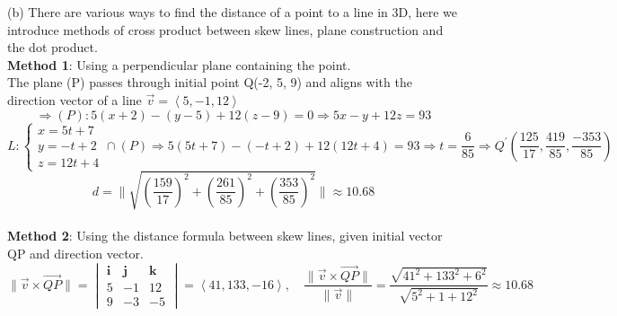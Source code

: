 \documentclass[a4paper]{exam}
\begin{document}
	\noindent (b) There are various ways to find the distance of a point to a line in 3D, here we introduce methods of cross product between skew lines, plane construction and the dot product. \\
	
	\hspace*{2mm} \textbf{Method 1}: Using a perpendicular plane containing the point. \\[0.5em]
	\noindent The plane (P) passes through initial point Q(-2, 5, 9) and aligns with the direction vector of a line $\vec{v} = \left\langle 5, -1, 12 \right\rangle$
	$$\Longrightarrow (P) : 5(x + 2) - (y - 5) + 12(z - 9) = 0 \Longrightarrow 5x - y + 12z = 93$$
	$$L: \begin{cases}
		x = 5t + 7 \\
		y = -t + 2 \\
		z = 12t + 4
	\end{cases} \cap (P) \Longrightarrow 5(5t + 7) - (-t + 2) + 12(12t + 4) = 93 \Longrightarrow t = \frac{6}{85} \Longrightarrow Q^{\prime}\left(\frac{125}{17}, \frac{419}{85}, \frac{-353}{85}\right)$$
	$$\boxed{d = \| \sqrt{\left(\frac{159}{17}\right)^{2} + \left(\frac{261}{85}\right)^{2} + \left(\frac{353}{85}\right)^{2}} \| \approx 10.68}$$\\
	
	\hspace*{2mm} \textbf{Method 2}: Using the distance formula between skew lines, given initial vector QP and direction vector.\\[0.5em]
	$$ \| \vec{v} \times \vec{QP} \| = \begin{vmatrix} 
		\mathbf{i} & \mathbf{j} & \mathbf{k} \\ 
		5 & -1 & 12 \\ 
		9 & -3 & -5 
	\end{vmatrix} = \left\langle 41, 133, -16 \right\rangle, \quad \frac{\| \vec{v} \times \vec{QP} \|}{\| \vec{v} \|} = \frac{\sqrt{41^{2} + 133^{2} + 6^{2}}}{\sqrt{5^{2} + 1 + 12^{2}}} \approx 10.68 $$
	
\end{document}
